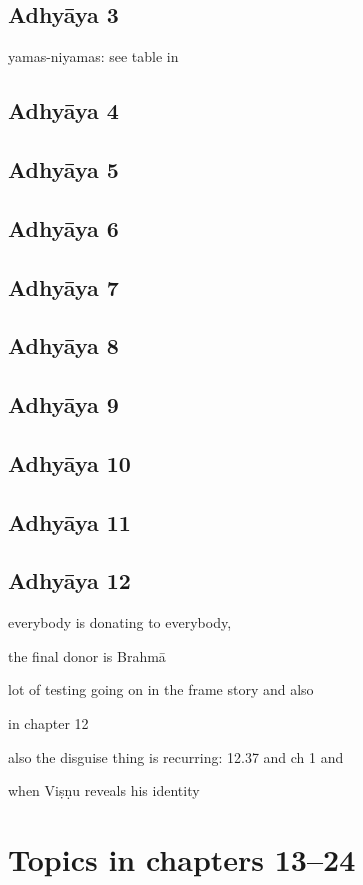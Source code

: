 \subsection{Adhyāya 3}\label{contents_of_ch03}
  yamas-niyamas: see table in 

\subsection{Adhyāya 4}\label{contents_of_ch04}
\subsection{Adhyāya 5}\label{contents_of_ch05}
\subsection{Adhyāya 6}\label{contents_of_ch06}
\subsection{Adhyāya 7}\label{contents_of_ch07}
\subsection{Adhyāya 8}\label{contents_of_ch08}
\subsection{Adhyāya 9}\label{contents_of_ch09}
\subsection{Adhyāya 10}\label{contents_of_ch10}
\label{no_pingala}

\subsection{Adhyāya 11}\label{contents_of_ch11}
\subsection{Adhyāya 12}\label{contents_of_ch12}

    everybody is donating to everybody,
  
    the final donor is Brahmā
  
    lot of testing going on in the frame story and also
  
    in chapter 12
  
    also the disguise thing is recurring: 12.37 and ch 1 and
  
    when Viṣṇu reveals his identity
    

\section{Topics in chapters 13--24}\label{contentsof12_24}

\vfill
\pagebreak
